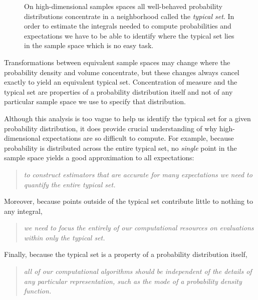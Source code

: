 \documentclass[11pt, oneside]{article}
\begin{document}
\begin{figure*}
\centering
{}
\caption{On high-dimensional samples spaces all well-behaved probability 
distributions concentrate in a neighborhood called the \emph{typical set}.  
In order to estimate the integrals needed to compute probabilities and 
expectations we have to be able to identify where the typical set lies in 
the sample space which is no easy task.
}
\label{fig:typical_set}
\end{figure*}

Transformations between equivalent sample spaces may change where 
the probability density and volume concentrate, but these changes always 
cancel exactly to yield an equivalent typical set.  Concentration of measure 
and the typical set are properties of a probability distribution itself and not 
of any particular sample space we use to specify that distribution.

Although this analysis is too vague to help us identify the typical set
for a given probability distribution, it does provide crucial understanding 
of why high-dimensional expectations are so difficult to compute.  For 
example, because probability is distributed across the entire typical set, 
no \emph{single} point in the sample space yields a good approximation 
to all expectations:
%
\begin{quote}
\emph{to construct estimators that are accurate for many expectations 
we need to quantify the entire typical set.}
\end{quote}
%
Moreover, because points outside of the typical set contribute little to 
nothing to any integral,
%
\begin{quote}
\emph{we need to focus the entirely of our computational resources on 
evaluations within only the typical set.}
\end{quote}
%  
Finally, because the typical set is a property of a probability distribution 
itself,
%
\begin{quote}
\emph{all of our computational algorithms should be independent of the 
details of any particular representation,  such as the mode of a probability 
density function.}
\end{quote}
\end{document}
